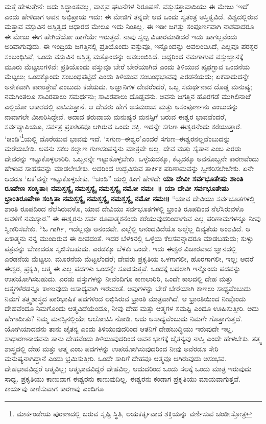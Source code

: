 ಮತ್ತೆ ಹೇಳುತ್ತೇನೆ: ಅದು ಸಿದ್ಧಾಂತವಲ್ಲ, ವಾಸ್ತವ ಘಟನೆಗಳ ನಿರೂಪಣೆ. ವಸ್ತುಸತ್ತಾವಾದಿಯು  ಈ ಮೇಜು ‘ಇದೆ’ ಎಂದು ಹೇಳಿದಾಗ ಅವನ ಅಭಿಪ್ರಾಯ ಇದು: ಈ ಮೇಜಿಗೆ ತನ್ನದೇ ಆದ ಒಂದು ಸ್ವತಂತ್ರ ಅಸ್ತಿತ್ವವಿದೆ. ವಿಶ್ವದಲ್ಲಿರುವ ಮತ್ತಾವ ವಸ್ತುವಿನ ಅಸ್ತಿತ್ವದ ಆಧಾರದ ಮೇಲೂ ಇದು ನಿಂತಿಲ್ಲ. ಈ ಇಡೀ ಜಗತ್ತು ಸಂಪೂರ್ಣವಾಗಿ ನಾಶವಾದರೂ ಈ ಮೇಜು ಈಗ ಹೇಗಿದೆಯೋ ಹಾಗೆಯೇ ಇರುತ್ತದೆ. ನಾವು ಸ್ವಲ್ಪ ವಿಚಾರಮಾಡಿದರೆ ಇದು ಹಾಗಲ್ಲವೆಂದು ಅರಿವಾಗುವುದು. ಈ ಇಂದ್ರಿಯ ಜಗತ್ತಿನಲ್ಲಿ ಪ್ರತಿಯೊಂದು ವಸ್ತುವೂ, ಇನ್ನೊಂದನ್ನು ಅವಲಂಬಿಸಿದೆ, ಎಲ್ಲವೂ ಪರಸ್ಪರ ಸಂಬಂಧಿಸಿವೆ, ಒಂದು ವಸ್ತುವಿನ ಅಸ್ತಿತ್ವ ಮತ್ತೊಂದನ್ನು ಅವಲಂಬಿಸಿದೆ. ಆದ್ದರಿಂದ ನಮಗಾಗುವ ವಸ್ತುಜ್ಞಾನಕ್ಕೆ ಮೂರು ಮೆಟ್ಟಲುಗಳಿವೆ: ಪ್ರತಿಯೊಂದು ವಸ್ತುವೂ ಬೇರೆ ಬೇರೆಯಾಗಿದೆ ಎಂದು ತಿಳಿಯುವ ಪೃಥಗ್ಭಾವ ಒಂದನೆಯ ಮೆಟ್ಟಲು; ಒಂದಕ್ಕೊಂದು ಸಂಬಂಧಪಟ್ಟಿದೆ ಎಂದು ತಿಳಿಯುವ ಸಂಬಂಧಭಾವವು ಎರಡನೆಯದು; ಏಕವಾದುದನ್ನೇ ಅನೇಕವಾಗಿ ಕಾಣುತ್ತೇವೆ ಎಂಬುದು ಕಡೆಯದು. ಅಜ್ಞಾನಿಗಳ ದೇವರೆಂದರೆ, ಒಬ್ಬ ಸಮರ್ಥನಾದ ದೊಡ್ಡ ಮನುಷ್ಯ; ನಮಗಿಂತಲೂ ಸಾವಿರಪಾಲು ಸಮರ್ಥನು; ಸಾವಿರಪಾಲು ದೊಡ್ಡವನು. ಅವನು ಜಗತ್ತಿನ ಹೊರಗಡೆ ಮುಗಿಲಿನಾಚೆ ಎಲ್ಲಿಯೋ ಆಕಾಶದಲ್ಲಿ ವಾಸಿಸುತ್ತಾನೆ. ಆ ದೇವರು ಹೇಗೆ ಅಸಮಂಜಸ ಮತ್ತು ಅಸಂಪೂರ್ಣನು ಎಂಬುದನ್ನು ನಾವಾಗಲೇ ವಿಚಾರಿಸಿದ್ದೇವೆ. ಅದಾದ ತರುವಾಯ ಮನುಷ್ಯರ ಮನಸ್ಸಿಗೆ ಬರುವ ಈಶ್ವರ ಭಾವವೆಂದರೆ, ಸರ್ವವ್ಯಾಪಿಯೂ, ಸರ್ವತ್ರ ಪ್ರಕಾಶಿತವೂ ಆಗಿರುವ ಒಂದು ಶಕ್ತಿ. ಇದನ್ನೇ ಸಗುಣ ಈಶ್ವರನೆಂದು ಕರೆಯುತ್ತಾರೆ. ‘ಚಂಡಿ’\footnote{ಮಾರ್ಕಂಡೇಯ ಪುರಾಣದಲ್ಲಿ ಬರುವ ಸೃಷ್ಟಿ ಸ್ಥಿತಿ, ಲಯಕರ್ತೃವಾದ ಶಕ್ತಿಯನ್ನು ವರ್ಣಿಸುವ ಚಂಡೀಸ್ತೋತ್ರ}ಯಲ್ಲಿ ದೊರೆಯುವ ಭಾವವು ಇದೆ. ‘ಸಗುಣ–ಈಶ್ವರ’ಎಂದರೆ ಸಗುಣ–ಈಶ್ವರನಲ್ಲವೆಂಬುದನ್ನು ಮರೆಯಬೇಡಿ. ಅವನು ಸಕಲ ಕಲ್ಯಾಣ ಗುಣಸಂಪನ್ನನು ಮಾತ್ರವೇ ಅಲ್ಲ. ದೇವ ಮತ್ತು ಸೈತಾನ ಎಂಬ ಎರಡು ದೇವರನ್ನು ಇಟ್ಟುಕೊಳ್ಳಲಾರಿರಿ. ಒಬ್ಬನನ್ನೇ ಇಟ್ಟುಕೊಳ್ಳಬೇಕು. ಒಳ್ಳೆಯದಕ್ಕೂ, ಕೆಟ್ಟದಕ್ಕೂ ಅವನೊಬ್ಬನೇ ಕಾರಣವೆಂದು ಹೇಳುವ ಸಾಹಸವನ್ನು ಮಾಡಲೇಬೇಕು. ಅದರಿಂದ ಉದ್ಭವಿಸುವ ತಾರ್ಕಿಕ ಪರಿಣಾಮವನ್ನು ಸ್ವೀಕರಿಸಲೇಬೇಕು. ಏನೇ ಆದರೂ ‘ಏಕ’ವನ್ನೇ ಇಟ್ಟುಕೊಳ್ಳಬೇಕು. “ಚಂಡಿ” ಯಲ್ಲಿ ಹೀಗೆ ಹೇಳಿದೆ: \textbf{ಯಾ ದೇವೀ ಸರ್ವಭೂತೇಷು ಶಾಂತಿ ರೂಪೇಣ ಸಂಸ್ಥಿತಾ। ನಮಸ್ತಸ್ಯೈ ನಮಸ್ತಸ್ಯೈ ನಮಸ್ತಸ್ಯೈ ನಮೋ ನಮಃ~॥ ಯಾ ದೇವೀ ಸರ್ವಭೂತೇಷು ಭ್ರಾಂತಿರೂಪೇಣ ಸಂಸ್ಥಿತಾ ನಮಸ್ತಸ್ಯೈ ನಮಸ್ತಸ್ಯೈ ನಮಸ್ತಸ್ಯೈ ನಮೋ ನಮಃ॥ } “ಯಾವ ದೇವಿಯು ಸರ್ವಭೂತಗಳಲ್ಲಿ ಶಾಂತಿ ರೂಪದಿಂದ ನೆಲೆಸಿರುವಳೊ, ಯಾವ ದೇವಿಯು ಸರ್ವಭೂತಗಳಲ್ಲಿ ಭ್ರಾಂತಿ ರೂಪದಿಂದ ನೆಲೆಸಿರುವಳೊ ಅವಳಿಗೆ ನಮಸ್ಕಾರ.” ಈ ಈಶ್ವರನು ಸರ್ವ ರೂಪಾತ್ಮಕನೆಂದು ಕರೆಯುವುದರಿಂದಾಗುವ ಎಲ್ಲ ಪರಿಣಾಮಗಳನ್ನೂ ನೀವು ಸ್ವೀಕರಿಸಬೇಕು. “ಓ ಗಾರ್ಗಿ, ಇದೆಲ್ಲವೂ ಆನಂದವೇ. ಎಲ್ಲೆಲ್ಲಿ ಆನಂದವಿದೆಯೊ ಅಲ್ಲೆಲ್ಲ ದಿವ್ಯತೆಯ ಅಂಶವಿದೆ. ಆ ಏಕಾತ್ಮನು ನನ್ನ ಮುಂದಿರುವ ಈ ದೀಪದಂತೆ. ಇದರ ಬೆಳಕಿನಲ್ಲಿ ಒಳ್ಳೆಯ ಕೆಲಸವನ್ನಾದರೂ ಮಾಡಬಹುದು; ಸುಳ್ಳು ಪತ್ರವನ್ನು ಬೇಕಾದರೂ ಸೃಜಿಸಬಹುದು. ಎರಡಕ್ಕೂ ಬೆಳಕು ಒಂದೇ. ಇದು ಈಶ್ವರ ವಿಚಾರವಾದ ಜ್ಞಾನದಲ್ಲಿ ಎರಡನೆಯ ಮೆಟ್ಟಲು. ಮೂರನೆಯ ಮೆಟ್ಟಲೆಂದರೆ; ದೇವರು ಪ್ರಕೃತಿಯ ಒಳಗಾಗಲೀ, ಹೊರಗಾಗಲೀ, ಇಲ್ಲ; ಆದರೆ ಈಶ್ವರ, ಪ್ರಕೃತಿ, ಆತ್ಮ ಈ ಎಲ್ಲ ಪದಗಳು ಒಂದನ್ನೇ ಸೂಚಿಸುತ್ತವೆ. ಒಂದಕ್ಕೆ ಬದಲಾಗಿ ಇನ್ನೊಂದು ಪದವನ್ನು ಉಪಯೋಗಿಸಬಹುದು. ಎರಡು ವಸ್ತುಗಳನ್ನು ನೀವೆಂದಿಗೂ ಕಾಣಲಾರಿರಿ, ಒಂದೇ ಕಾಲದಲ್ಲಿ ದೇಹ ಮತ್ತು ಆತ್ಮಗಳೆರಡನ್ನೂ ಕಾಣುವುದು ಅಸಾಧ್ಯವಾಗಿ ಇರುವಂತೆ. ಅವುಗಳನ್ನು ಬೇರೆ ಬೇರೆಯಾಗಿ ಕಾಣಲು ಸಾಧ್ಯವೆಂಬುದು ನಿಮಗೆ ತತ್ತ್ವಶಾಸ್ತ್ರದ ಪಾರಿಭಾಷಿಕ ಪದಗಳಿಂದ ಲಭಿಸಿರುವ ಭ್ರಾಂತಿ ಮಾತ್ರವಾಗಿದೆ. ಆ ಭ್ರಾಂತಿಯಿಂದ ನೀವೊಂದು ದೇಹವೆಂದೂ ನಿಮಗೊಂದು ಆತ್ಮವಿದೆಯೆಂದೂ, ನೀವು ದೇಹ ಮತ್ತು ಆತ್ಮಗಳ ಸಮಷ್ಟಿ ಎಂದೂ ಊಹಿಸುತ್ತೀರಿ. ಅದು ಹೇಗಾದೀತು? ನಿಮ್ಮ ಮನಸ್ಸಿನಲ್ಲಿಯೇ ಆಲೋಚಿಸಿ ನೋಡಿ. ಅದು ಅಸಾಧ್ಯವೆಂಬುದು ನಿಮಗೇ ಗೊತ್ತಾಗುತ್ತದೆ. ಯೋಗಿಯಾದವನು ತಾನು ಚೈತನ್ಯ ಎಂದು ತಿಳಿಯುವುದರಿಂದ ಆತನಿಗೆ ದೇಹಬುದ್ಧಿಯು ಇರುವುದೇ ಇಲ್ಲ. ಸಾಧಾರಣನಾದವನು ತಾನು ದೇಹವೆಂದು ತಿಳಿಯುವುದರಿಂದ ಅವನ ಭಾಗಕ್ಕೆ ಚೈತನ್ಯವು ನಾಸ್ತಿ ಎಂದೇ ಹೇಳಬೇಕು. ತತ್ತ್ವ ಶಾಸ್ತ್ರದಲ್ಲಿ ದೇಹ ಮತ್ತು ಆತ್ಮ ಎಂಬ ಪದಗಳನ್ನು ಉಪಯೋಗಿಸುವುದರಿಂದ ನೀವು ಅವೆರಡೂ ಸೇರಿ ಮನುಷ್ಯನಾಗಿದ್ದಾನೆ ಎಂದು ಭ್ರಮಿಸುತ್ತೀರಿ. ಒಂದೇ ಸಾರಿಗೆ ದೇಹವೂ ಆತ್ಮವೂ ಆಗಿರುವುದು ಅಸಂಭವ. ದೇಹಭಾವವಿದ್ದರೆ ಆತ್ಮವಿಲ್ಲ; ಆತ್ಮಭಾವವಿದ್ದರೆ ದೇಹವಿಲ್ಲ. ಆದುದರಿಂದ ಒಂದು ಸಲಕ್ಕೆ ಒಂದು ಮಾತ್ರ ಇರುವುದು ಸಾಧ್ಯ. ಪ್ರಕೃತಿಯು ಕಾಣುವಾಗ ಈಶ್ವರನು ಕಾಣುವುದಿಲ್ಲ. ಈಶ್ವರನು ಕಂಡಾಗ ಪ್ರಕೃತಿಯು ಮಾಯವಾಗುತ್ತವೆ. ಕಾರ್ಯವು ಕಾಣಿಸುವಾಗ ಕಾರಣವು ಎಂದಿಗೂ 